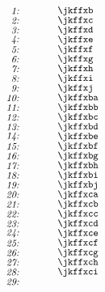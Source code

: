 \[
\begin{picture}(420,530)(-55,-530)

\put(-55,-10){\makebox(15,10)[r]{\it 1:}}%
\put(0,-10){\makebox(100,10)[l]{\jkffxb}}
\put(-55,-20){\makebox(15,10)[r]{\it 2:}}%
\put(0,-20){\makebox(100,10)[l]{\jkffxc}}
\put(-55,-30){\makebox(15,10)[r]{\it 3:}}%
\put(0,-30){\makebox(100,10)[l]{\jkffxd}}
\put(-55,-40){\makebox(15,10)[r]{\it 4:}}%
\put(0,-40){\makebox(100,10)[l]{\jkffxe}}
\put(-55,-50){\makebox(15,10)[r]{\it 5:}}%
\put(0,-50){\makebox(100,10)[l]{\jkffxf}}
\put(-55,-60){\makebox(15,10)[r]{\it 6:}}%
\put(0,-60){\makebox(100,10)[l]{\jkffxg}}
\put(-55,-70){\makebox(15,10)[r]{\it 7:}}%
\put(0,-70){\makebox(100,10)[l]{\jkffxh}}
\put(-55,-80){\makebox(15,10)[r]{\it 8:}}%
\put(0,-80){\makebox(100,10)[l]{\jkffxi}}
\put(-55,-90){\makebox(15,10)[r]{\it 9:}}%
\put(0,-90){\makebox(100,10)[l]{\jkffxj}}
\put(-55,-100){\makebox(15,10)[r]{\it 10:}}%
\put(0,-100){\makebox(100,10)[l]{\jkffxba}}
\put(-55,-110){\makebox(15,10)[r]{\it 11:}}%
\put(0,-110){\makebox(100,10)[l]{\jkffxbb}}
\put(-55,-120){\makebox(15,10)[r]{\it 12:}}%
\put(0,-120){\makebox(100,10)[l]{\jkffxbc}}
\put(-55,-130){\makebox(15,10)[r]{\it 13:}}%
\put(0,-130){\makebox(100,10)[l]{\jkffxbd}}
\put(-55,-140){\makebox(15,10)[r]{\it 14:}}%
\put(0,-140){\makebox(100,10)[l]{\jkffxbe}}
\put(-55,-150){\makebox(15,10)[r]{\it 15:}}%
\put(0,-150){\makebox(100,10)[l]{\jkffxbf}}
\put(-55,-160){\makebox(15,10)[r]{\it 16:}}%
\put(0,-160){\makebox(100,10)[l]{\jkffxbg}}
\put(-55,-170){\makebox(15,10)[r]{\it 17:}}%
\put(0,-170){\makebox(100,10)[l]{\jkffxbh}}
\put(-55,-180){\makebox(15,10)[r]{\it 18:}}%
\put(0,-180){\makebox(100,10)[l]{\jkffxbi}}
\put(-55,-190){\makebox(15,10)[r]{\it 19:}}%
\put(0,-190){\makebox(100,10)[l]{\jkffxbj}}
\put(-55,-200){\makebox(15,10)[r]{\it 20:}}%
\put(0,-200){\makebox(100,10)[l]{\jkffxca}}
\put(-55,-210){\makebox(15,10)[r]{\it 21:}}%
\put(0,-210){\makebox(100,10)[l]{\jkffxcb}}
\put(-55,-220){\makebox(15,10)[r]{\it 22:}}%
\put(0,-220){\makebox(100,10)[l]{\jkffxcc}}
\put(-55,-230){\makebox(15,10)[r]{\it 23:}}%
\put(0,-230){\makebox(100,10)[l]{\jkffxcd}}
\put(-55,-240){\makebox(15,10)[r]{\it 24:}}%
\put(0,-240){\makebox(100,10)[l]{\jkffxce}}
\put(-55,-250){\makebox(15,10)[r]{\it 25:}}%
\put(0,-250){\makebox(100,10)[l]{\jkffxcf}}
\put(-55,-260){\makebox(15,10)[r]{\it 26:}}%
\put(0,-260){\makebox(100,10)[l]{\jkffxcg}}
\put(-55,-270){\makebox(15,10)[r]{\it 27:}}%
\put(0,-270){\makebox(100,10)[l]{\jkffxch}}
\put(-55,-280){\makebox(15,10)[r]{\it 28:}}%
\put(0,-280){\makebox(100,10)[l]{\jkffxci}}
\put(-55,-290){\makebox(15,10)[r]{\it 29:}}%

\end{picture}\]
